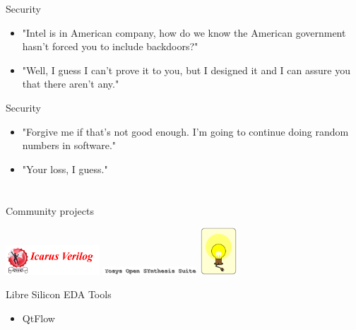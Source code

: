 \documentclass[9pt]{beamer}
\begin{document}
\begin{frame}{Security}
	\begin{itemize}
        \setlength\itemsep{1em}
        \item "Intel is in American company, how do we know the American government hasn't forced you to include backdoors?"
        \item "Well, I guess I can't prove it to you, but I designed it and I can assure you that there aren't any."
	\end{itemize}    
\end{frame}

\begin{frame}{Security}
	\begin{itemize}
        \setlength\itemsep{1em}
        \item "Forgive me if that's not good enough. I'm going to continue doing random numbers in software."
        \item "Your loss, I guess."
	\end{itemize}    
\end{frame}

\section[Who]{}
\begin{frame}{Community projects}
	\begin{center}
		\includegraphics[width=100pt]{Icarus.png}
		\includegraphics[width=100pt]{Yosys.png}
		\includegraphics[height=50pt]{Opencircuit.png}
	\end{center}
\end{frame}

\begin{frame}{Libre Silicon EDA Tools}
	\begin{itemize}
        \item QtFlow
	\end{itemize}    
\end{frame}
\end{document}
